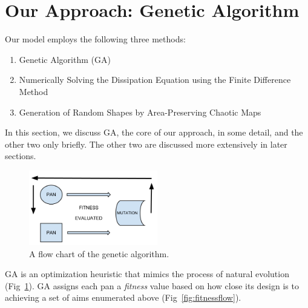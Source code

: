 \documentclass[12pt]{reedmcm}
\begin{document}
\section{Our Approach: Genetic Algorithm}
Our model employs the following three methods:
\begin{enumerate}
  \item Genetic Algorithm (GA)
  \item Numerically Solving the Dissipation Equation using the Finite Difference Method
  \item Generation of Random Shapes by Area-Preserving Chaotic Maps
\end{enumerate}
In this section, we discuss GA, the core of our approach, in some detail, and the other two only briefly.
The other two are discussed more extensively in later sections. 
%
\begin{figure}[p]
  \centering
  \includegraphics[width=0.5\textwidth]{ga_flowchart}
  \caption{A flow chart of the genetic algorithm.}
  \label{fig:gaflow}
\end{figure}

GA is an optimization heuristic that mimics the process of natural evolution (Fig~\ref{fig:gaflow}).
GA assigns each pan a \textit{fitness} value based on how close its design is to achieving a set of aims enumerated above (Fig~\ref{fig:fitnessflow}).
\end{document}
